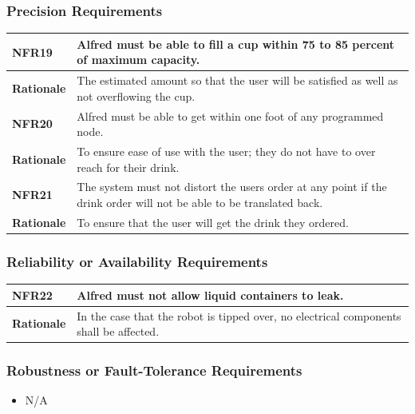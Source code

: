 \documentclass [11pt]{article}
\begin{document}
\subsubsection{Precision Requirements}

\begin{longtable}{| p{ } | p{ } | }\hline 
\rowcolor{tableCell}\textbf{NFR19} & Alfred must be able to fill a cup within 75 to 85 percent of maximum capacity.\\ \hline
\textbf{Rationale} & The estimated amount so that the user will be satisfied as well as not overflowing the cup.\\ \hline 
\rowcolor{tableCell}\textbf{NFR20} & Alfred must be able to get within one foot of any programmed node. \\ \hline
\textbf{Rationale} & To ensure ease of use with the user; they do not have to over reach for their drink. \\ \hline
\rowcolor{tableCell}\textbf{NFR21} & The system must not distort the users order at any point if the drink order will not be able to be translated back. \\ \hline
\textbf{Rationale} & To ensure that the user will get the drink they ordered.\\ \hline	
\end{longtable}


\pagebreak
\subsubsection{Reliability or Availability Requirements}

\begin{longtable}{| p{ } | p{ } | }\hline 
\rowcolor{tableCell}\textbf{NFR22} &  Alfred must not allow liquid containers to leak. \\ \hline
\textbf{Rationale} & In the case that the robot is tipped over, no electrical components shall be affected.\\ \hline 
\end{longtable}

\subsubsection{Robustness or Fault-Tolerance Requirements }
	\begin{itemize}
		\item N/A
	\end{itemize}
\end{document}

